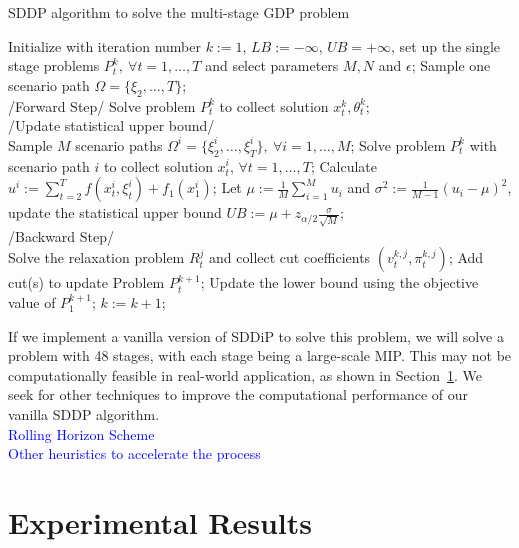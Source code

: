 \documentclass[12pt]{article}
\begin{document}
	\begin{algorithm}[H]
		\caption{SDDP algorithm to solve the multi-stage GDP problem}
		\label{alg:SDDP}
		\begin{algorithmic}[1]
			\State Initialize with iteration number \(k := 1\), \(LB := -\infty\), \(UB = +\infty\), set up the single stage problems \(P_t^k,\ \forall t = 1, \dots, T\) and select parameters \(M, N\) and \(\epsilon\);
			\State Sample one scenario path \(\Omega = \{\xi_2, \dots, T\}\); \\
			\State /Forward Step/
			\State Solve problem \(P_t^k\) to collect solution \(x_t^k, \theta_t^k\);
			\EndFor\\
			\State /Update statistical upper bound/\\
			\State Sample \(M\) scenario paths \(\Omega^i = \{\xi^i_2, \dots, \xi^i_T\}, \ \forall i = 1, \dots, M\);
			\State Solve problem \(P_t^k\) with scenario path \(i\) to collect solution \(x_t^i\), \(\forall t = 1, \dots, T\);
			\State Calculate \(u^i := \sum_{t = 2}^{T} f(x_t^i, \xi_t^i) + f_1(x_1^i)\);
			\EndFor
			\State Let \(\mu := \frac{1}{M} \sum_{i = 1}^{M} u_i\) and \(\sigma^2 := \frac{1}{M-1} (u_i - \mu)^2\), update the statistical upper bound \(UB := \mu + z_{\alpha/2}\frac{\sigma}{\sqrt{M}}\);
			\EndIf\\
			\State /Backward Step/\\
			\State Solve the relaxation problem \(R_t^j\) and collect cut coefficients \((v_t^{k,j}, \pi_t^{k,j})\);
			\EndFor
			\State Add cut(s) to update Problem \(P_t^{k+1}\);
			\EndFor
			\State Update the lower bound using the objective value of \(P_1^{k+1}\);
			\State \(k := k + 1\);
			\EndWhile
		\end{algorithmic}
	\end{algorithm}
	\noindent If we implement a vanilla version of SDDiP to solve this problem, we will solve a problem with 48 stages, with each stage being a large-scale MIP. This may not be computationally feasible in real-world application, as shown in Section~\ref{expResults}. We seek for other techniques to improve the computational performance of our vanilla SDDP algorithm.\\
	\newline
	\textcolor{blue}{Rolling Horizon Scheme}\\
	\textcolor{blue}{Other heuristics to accelerate the process}
\section{Experimental Results}\label{expResults}

\nocite{*}


\end{document}
